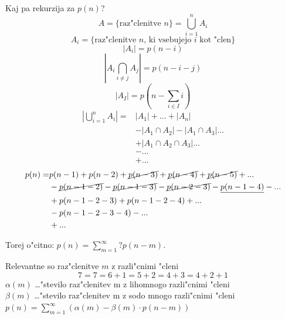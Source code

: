 \documentclass[a4paper,12pt]{article}
\theoremstyle{definition}
\theoremstyle{remark}
\begin{document}
\label{TODO: why is this commented out}

Kaj pa rekurzija za $p(n)$?
\[A = \{\text{raz"clenitve }n\} = \bigcup_{i = 1}^n A_i\]
\[A_i = \{\text{raz"clenitve }n\text{, ki vsebujejo }i\text{ kot "clen}\}\]
\[|A_i| = p(n - i)\]
\[|A_i \bigcap_{i \neq j} A_j| = p(n - i - j)\]
\[|A_I| = p(n - \sum_{i \in I} i)\]
\begin{align}
	|\bigcup_{i = 1}^n A_i| = & |A_1| + ... + |A_n|\nonumber\\
    			& - |A_1 \cap A_2| - |A_1 \cap A_3| ...\nonumber\\
                & + |A_1 \cap A_2 \cap A_3| ...\nonumber\\
                & - ...\nonumber\\
                & + ...\nonumber
\end{align}
\label{TODO: tukej pogresam malo texta}
\begin{align}
	p(n) = & p(n - 1) + p(n - 2) + \cancel{p(n - 3)} + \cancel{p(n - 4)} + \cancel{p(n - 5)} + ...\nonumber\\
    	& - \cancel{p(n - 1 - 2)} - \cancel{p(n - 1 - 3)} - \cancel{p(n - 2 - 3)} - \underline{p(n - 1 - 4)} - ...\nonumber\\
        & + p(n - 1 - 2 - 3) + p(n - 1 - 2 - 4) + ...\nonumber\\
        & - p(n - 1 - 2 - 3 - 4) - ...\nonumber\\
        & + ...\nonumber
\end{align}

\label{TODO: fill in the question mark}
Torej o"citno: $p(n) = \displaystyle\sum_{m=1}^{\infty} ? p(n - m)$.

Relevantne so raz"clenitve $m$ z razli"cnimi "cleni
\[7 = 7 = 6 + 1 = 5 + 2 = 4 + 3 = 4 + 2 + 1\]
$\alpha(m)$ \ldots "stevilo raz"clenitev m z lihomnogo razli"cnimi "cleni\\
$\beta(m)$ \ldots "stevilo raz"clenitev m z sodo mnogo razli"cnimi "cleni\\
$p(n) = \sum_{m = 1}^{\infty} (\alpha(m) - \beta (m)\cdot p(n - m))$
\end{document}
